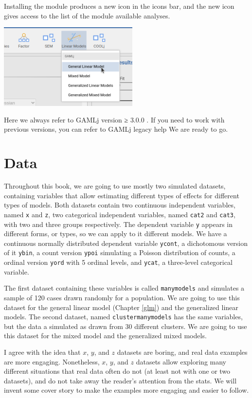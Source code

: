 \documentclass[
]{book}
\begin{document}
Installing the module produces a new icon in the icons bar, and the new icon gives access to the list of the module available analyses.

\includegraphics[width=0.5\linewidth]{bookletpics/0_menu1}

Here we always refer to { { GAMLj version ≥ } 3.0.0 }. If you need to work with previous versions, you can refer to GAMLj legacy help
We are ready to go.

\hypertarget{data}{%
\section{Data}\label{data}}

Throughout this book, we are going to use mostly two simulated datasets, containing variables that allow estimating different types of effects for different types of models. Both datasets contain two continuous independent variables, named \texttt{x} and \texttt{z}, two categorical independent variables, named \texttt{cat2} and \texttt{cat3}, with two and three groups respectively. The dependent variable \texttt{y} appears in different forms, or types, so we can apply to it different models. We have a continuous normally distributed dependent variable \texttt{ycont}, a dichotomous version of it \texttt{ybin}, a count version \texttt{ypoi} simulating a Poisson distribution of counts, a ordinal version \texttt{yord} with 5 ordinal levels, and \texttt{ycat}, a three-level categorical variable.

The first dataset containing these variables is called \texttt{manymodels} and simulates a sample of 120 cases drawn randomly for a population. We are going to use this dataset for the general linear model (Chapter \ref{glm}) and the generalized linear models. The second dataset, named \texttt{clustermanymodels} has the same variables, but the data a simulated as drawn from 30 different clusters. We are going to use this dataset for the mixed model and the generalized mixed models.

I agree with the idea that \(x\), \(y\), and \(z\) datasets are boring, and real data examples are more engaging. Nonetheless, \(x\), \(y\), and \(z\) datasets allow exploring many different situations that real data often do not (at least not with one or two datasets), and do not take away the reader's attention from the stats. We will invent some cover story to make the examples more engaging and easier to follow.
\end{document}
